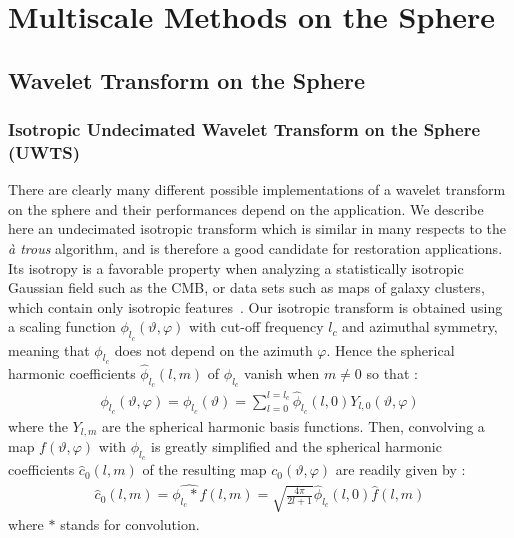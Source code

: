 

\chapter{Multiscale Methods on the Sphere}
\label{ch_mms}

\section{Wavelet Transform on the Sphere}
\label{sect_wts}

\subsection{Isotropic Undecimated Wavelet Transform on the Sphere (UWTS) }

There are clearly many different possible implementations of a wavelet transform on the sphere and their performances depend on the application. 
We describe here an undecimated isotropic transform which is similar in many respects to the \emph{ \`a trous} algorithm, and is therefore a good 
candidate for restoration applications. Its isotropy is a favorable property when analyzing a statistically isotropic Gaussian field such as the 
CMB, or data sets such as maps of galaxy clusters, which contain only isotropic features~\cite{starck:book98}. Our isotropic transform is obtained 
using a scaling function $\phi_{l_c}(\vartheta, \varphi)$ with cut-off frequency $l_c$ and azimuthal symmetry, meaning that $\phi_{l_c}$ does not 
depend on the azimuth $\varphi$. Hence the spherical harmonic coefficients $\hat \phi_{l_c} (l,m)$ of $\phi_{l_c}$ vanish when $m \ne 0$ so that :
\begin{eqnarray}
\phi_{l_c}(\vartheta, \varphi)= \phi_{l_c}(\vartheta) = \sum_{l = 0}^{l = l_c} \hat \phi_{l_c} (l,0) Y_{l,0}(\vartheta, \varphi)
\end{eqnarray}
where the $Y_{l,m}$ are the spherical harmonic basis functions. Then, convolving a map $f(\vartheta, \varphi)$ with $\phi_{l_c}$ is greatly simplified 
and the spherical harmonic coefficients $\hat c_{0}(l,m)$ of the resulting map $c_0(\vartheta, \varphi)$ are readily given by \cite{bogdanova}:
\begin{eqnarray}\label{eq:conv}
 \hat c_{0}(l,m) = \widehat{\phi_{l_c} * f} (l,m) = \sqrt{\frac{4\pi}{2l+1} } \hat \phi_{l_c} (l,0) \hat f(l,m) 
\end{eqnarray}
where $*$ stands for convolution.

